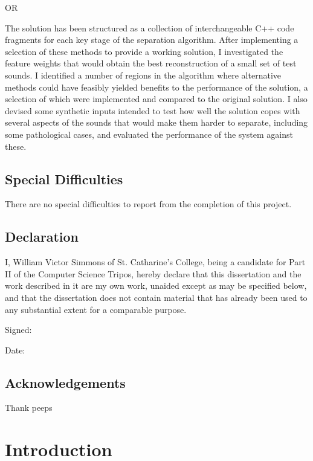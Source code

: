 \documentclass[10pt,twoside,a4paper]{report}
\begin{document}
OR

The solution has been structured as a collection of interchangeable C++ code fragments for each key stage of the separation algorithm. After implementing a selection of these methods to provide a working solution, I investigated the feature weights that would obtain the best reconstruction of a small set of test sounds. I identified a number of regions in the algorithm where alternative methods could have feasibly yielded benefits to the performance of the solution, a selection of which were implemented and compared to the original solution. I also devised some synthetic inputs intended to test how well the solution copes with several aspects of the sounds that would make them harder to separate, including some pathological cases, and evaluated the performance of the system against these.

\section*{Special Difficulties}

There are no special difficulties to report from the completion of this project.

\pagebreak

\section*{Declaration}

I, William Victor Simmons of St. Catharine's College, being a candidate for Part II of the Computer Science Tripos, hereby declare that this dissertation and the work described in it are my own work, unaided except as may be specified below, and that the dissertation does not contain material that has already been used to any substantial extent for a comparable purpose.

Signed:

Date:

\tableofcontents

\listoffigures

\pagebreak

\section*{Acknowledgements}

Thank peeps

\chapter{Introduction}
\end{document}
